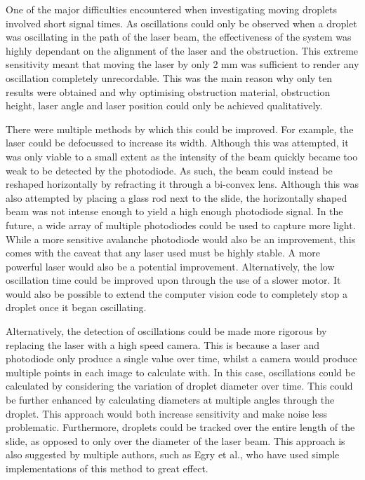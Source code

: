 \documentclass{physics_article_B}
\begin{document}
    One of the major difficulties encountered when investigating moving droplets involved short signal times. As oscillations could only be observed when a droplet was oscillating in the path of the laser beam, the effectiveness of the system was highly dependant on the alignment of the laser and the obstruction. This extreme sensitivity meant that moving the laser by only 2 mm was sufficient to render any oscillation completely unrecordable. This was the main reason why only ten results were obtained and why optimising obstruction material, obstruction height, laser angle and laser position could only be achieved qualitatively. 
    
    There were multiple methods by which this could be improved. For example, the laser could be defocussed to increase its width. Although this was attempted, it was only viable to a small extent as the intensity of the beam quickly became too weak to be detected by the photodiode. As such, the beam could instead be reshaped horizontally by refracting it through a bi-convex lens. Although this was also attempted by placing a glass rod next to the slide, the horizontally shaped beam was not intense enough to yield a high enough photodiode signal. In the future, a wide array of multiple photodiodes could be used to capture more light. While a more sensitive avalanche photodiode would also be an improvement, this comes with the caveat that any laser used must be highly stable. A more powerful laser would also be a potential improvement. Alternatively, the low oscillation time could be improved upon through the use of a slower motor. It would also be possible to extend the computer vision code to completely stop a droplet once it began oscillating. 
    
    Alternatively, the detection of oscillations could be made more rigorous by replacing the laser with a high speed camera. This is because a laser and photodiode only produce a single value over time, whilst a camera would produce multiple points in each image to calculate with. In this case, oscillations could be calculated by considering the variation of droplet diameter over time. This could be further enhanced by calculating diameters at multiple angles through the droplet. This approach would both increase sensitivity and make noise less problematic. Furthermore, droplets could be tracked over the entire length of the slide, as opposed to only over the diameter of the laser beam. This approach is also suggested by multiple authors, such as Egry et al.\cite{egry}, who have used simple implementations of this method to great effect.
    
\end{document}
